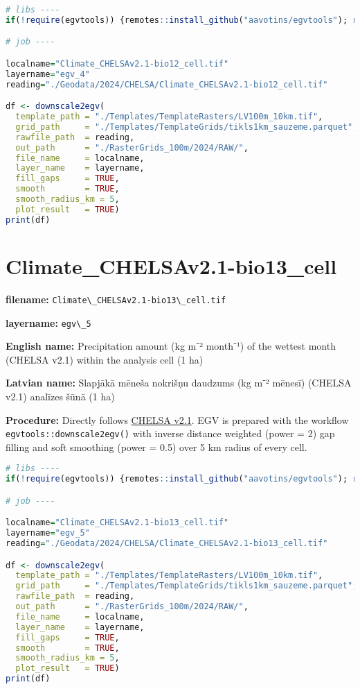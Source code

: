 \documentclass[
]{book}
\newcommand{\passthrough}[1]{#1}
\begin{document}
\begin{lstlisting}[language=R]
# libs ----
if(!require(egvtools)) {remotes::install_github("aavotins/egvtools"); require(egvtools)}

# job ----

localname="Climate_CHELSAv2.1-bio12_cell.tif"
layername="egv_4"
reading="./Geodata/2024/CHELSA/Climate_CHELSAv2.1-bio12_cell.tif"

df <- downscale2egv(
  template_path = "./Templates/TemplateRasters/LV100m_10km.tif",
  grid_path     = "./Templates/TemplateGrids/tikls1km_sauzeme.parquet",
  rawfile_path  = reading,
  out_path      = "./RasterGrids_100m/2024/RAW/",
  file_name     = localname,
  layer_name    = layername,
  fill_gaps     = TRUE,
  smooth        = TRUE,
  smooth_radius_km = 5,
  plot_result   = TRUE)
print(df)
\end{lstlisting}

\section{Climate\_CHELSAv2.1-bio13\_cell}\label{ch06.005}

\textbf{filename:} \passthrough{\lstinline!Climate\_CHELSAv2.1-bio13\_cell.tif!}

\textbf{layername:} \passthrough{\lstinline!egv\_5!}

\textbf{English name:} Precipitation amount (kg m⁻² month⁻¹) of the wettest month (CHELSA v2.1) within the analysis cell (1 ha)

\textbf{Latvian name:} Slapjākā mēneša nokrišņu daudzums (kg m⁻² mēnesī) (CHELSA v2.1) analīzes šūnā (1 ha)

\textbf{Procedure:} Directly follows \hyperref[Ch04.11]{CHELSA v2.1}. EGV is prepared with the
workflow \passthrough{\lstinline!egvtools::downscale2egv()!} with inverse distance weighted (power = 2)
gap filling and soft smoothing (power = 0.5) over 5 km radius of every cell.

\begin{lstlisting}[language=R]
# libs ----
if(!require(egvtools)) {remotes::install_github("aavotins/egvtools"); require(egvtools)}

# job ----

localname="Climate_CHELSAv2.1-bio13_cell.tif"
layername="egv_5"
reading="./Geodata/2024/CHELSA/Climate_CHELSAv2.1-bio13_cell.tif"

df <- downscale2egv(
  template_path = "./Templates/TemplateRasters/LV100m_10km.tif",
  grid_path     = "./Templates/TemplateGrids/tikls1km_sauzeme.parquet",
  rawfile_path  = reading,
  out_path      = "./RasterGrids_100m/2024/RAW/",
  file_name     = localname,
  layer_name    = layername,
  fill_gaps     = TRUE,
  smooth        = TRUE,
  smooth_radius_km = 5,
  plot_result   = TRUE)
print(df)
\end{lstlisting}
\end{document}
